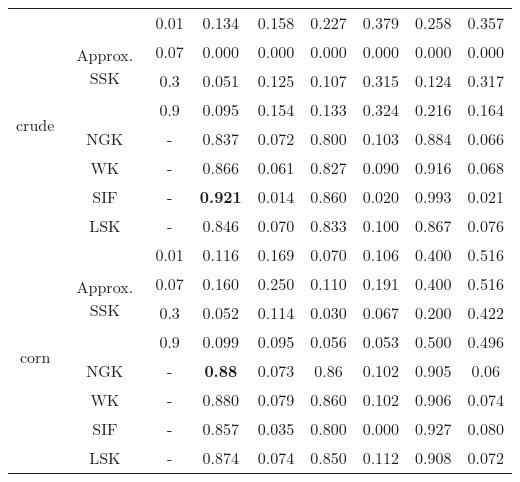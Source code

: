 \documentclass{article}
\begin{document}
\begin{table}[]
\begin{tabular}{|c|c|c|c|c|c|c|c|c|}
 \multirow{8}{*}{crude} &
 \multirow{4}{*}{Approx. SSK}
   & 0.01 & 0.134 & 0.158 & 0.227 & 0.379 & 0.258 & 0.357  \\
 & & 0.07 & 0.000 & 0.000 & 0.000 & 0.000 & 0.000 & 0.000  \\
 & & 0.3 & 0.051 & 0.125 & 0.107 & 0.315 & 0.124 & 0.317  \\
 & & 0.9 & 0.095 & 0.154 & 0.133 & 0.324 & 0.216 & 0.164  \\ \cline{2-9}
 & \multirow{1}{*}{NGK} & - & 0.837 & 0.072 & 0.800 & 0.103 & 0.884 & 0.066 \\ \cline{2-9}
 & \multirow{1}{*}{WK}  & - & 0.866 & 0.061 & 0.827 & 0.090 & 0.916 & 0.068 \\ \cline{2-9}
 & \multirow{1}{*}{SIF} & - & \textbf{0.921} & 0.014 & 0.860 & 0.020 & 0.993 & 0.021 \\ \cline{2-9}
 & \multirow{1}{*}{LSK} & - & 0.846 & 0.070 & 0.833 & 0.100 & 0.867 & 0.076 \\ \hline
 \multirow{8}{*}{corn} &
 \multirow{4}{*}{Approx. SSK}
   & 0.01 & 0.116 & 0.169 & 0.070 & 0.106 & 0.400 & 0.516  \\
 & & 0.07 & 0.160 & 0.250 & 0.110 & 0.191 & 0.400 & 0.516  \\
 & & 0.3  & 0.052 & 0.114 & 0.030 & 0.067 & 0.200 & 0.422  \\
 & & 0.9  & 0.099 & 0.095 & 0.056 & 0.053 & 0.500 & 0.496  \\ \cline{2-9}
 & \multirow{1}{*}{NGK} & - & \textbf{0.88} & 0.073 & 0.86 & 0.102 & 0.905 & 0.06 \\ \cline{2-9}
 & \multirow{1}{*}{WK}  & - & 0.880 & 0.079 & 0.860 & 0.102 & 0.906 & 0.074 \\ \cline{2-9}
 & \multirow{1}{*}{SIF} & - & 0.857 & 0.035 & 0.800 & 0.000 & 0.927 & 0.080 \\ \cline{2-9}
 & \multirow{1}{*}{LSK} & - & 0.874 & 0.074 & 0.850 & 0.112 & 0.908 & 0.072 \\ \hline
\end{tabular}
\end{table}
\end{document}
